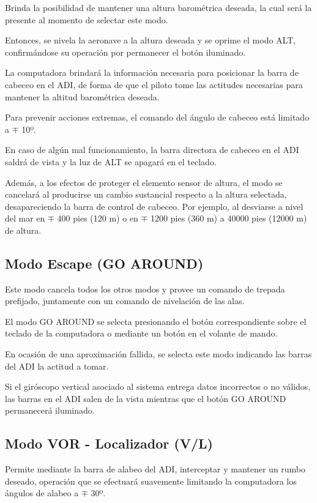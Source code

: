\documentclass[a4paper,12pt,twoside]{article}
\begin{document}
Brinda la posibilidad de mantener una altura barom\'etrica deseada,
la cual ser\'a la presente al momento de selectar este modo.

Entonces, se nivela la aeronave a la altura deseada y se oprime
el modo ALT, confirm\'andose su operaci\'on por permanecer el 
bot\'on iluminado.

La computadora brindar\'a la informaci\'on necesaria para
posicionar la barra de cabeceo en el ADI, de forma de 
que el piloto tome las actitudes necesarias para mantener
la altitud barom\'etrica deseada.

Para prevenir acciones extremas, el comando del \'angulo de
cabeceo est\'a limitado a $\mp$ 10º.

En caso de alg\'un mal funcionamiento, la barra directora
de cabeceo en el ADI saldr\'a de vista y la luz de ALT
se apagar\'a en el teclado.

Adem\'as, a los efectos de proteger el elemento sensor de altura,
el modo se cancelar\'a al producirse un cambio sustancial respecto
a la altura selectada, desapareciendo la barra de control
de cabeceo.
Por ejemplo, al desviarse a nivel del mar en $\mp$ 400 pies (120 m)
o en $\mp$ 1200 pies (360 m) a 40000 pies (12000 m) de altura. 


\subsection{Modo Escape (GO AROUND)}
\label{sec:go.araund}

Este modo cancela todos los otros modos y provee un comando de trepada
prefijado, juntamente con un comando de nivelaci\'on de las alas.

El modo GO AROUND se selecta presionando el bot\'on correspondiente
sobre el teclado de la computadora o mediante un bot\'on en el
volante de mando.

En ocasi\'on de una aproximaci\'on fallida, se selecta este modo
indicando las barras del ADI la actitud a tomar.

Si el gir\'oscopo vertical asociado al sistema entrega datos
incorrectos o no v\'alidos, las barras en el ADI salen de
la vista mientras que el bot\'on GO AROUND permanecer\'a iluminado.


\subsection{Modo VOR - Localizador (V/L)}
\label{sec:V_L}

Permite mediante la barra de alabeo del ADI, interceptar y mantener
un rumbo deseado, operaci\'on que se efectuar\'a suavemente
limitando la computadora los \'angulos de alabeo a $\mp$ 30º.
\end{document}

